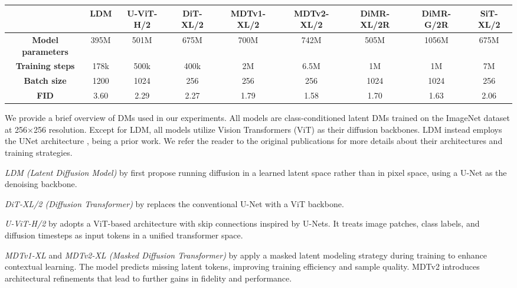 \begin{table*}[h!]
    \scriptsize
        \newcommand{\tightcolsep}{\setlength{\tabcolsep}{3.5pt}} %
    \tightcolsep %
    \centering
        \caption{\textbf{DM details.} We report the training details for the DM  models used in this work.}
    \begin{tabular}{ccccccccc}
    \toprule
\textbf{} & LDM & {U-ViT-H/2} & {DiT-XL/2} & {MDTv1-XL/2} & {MDTv2-XL/2} & {DiMR-XL/2R} & {DiMR-G/2R} & {SiT-XL/2} \\
    \midrule
\textbf{Model parameters} & 395M & 501M & 675M & 700M & 742M & 505M & 1056M & 675M \\

    \textbf{Training steps} & 178k & 500k & 400k & 2M & 6.5M  & 1M & 1M &  7M \\
    \textbf{Batch size} & 1200 & 1024 & 256 & 256 & 256 & 1024 & 1024 & 256  \\
    \textbf{FID} & 3.60 & 2.29 & 2.27 & 1.79 & 1.58 & 1.70 & 1.63  & 2.06 \\
    \bottomrule
    \end{tabular}
    \label{tab:dm_details}
\end{table*}


{We provide a brief overview of DMs used in our experiments. All models are class-conditioned latent DMs trained on the ImageNet dataset at 256×256 resolution.}
{Except for LDM, all models utilize Vision Transformers (ViT) \citep{dosovitskiy2021imageworth16x16words} as their diffusion backbones. LDM instead employs the UNet architecture \cite{unet}, being a prior work. We refer the reader to the original publications for more details about their architectures and training strategies.}

{\textit{LDM (Latent Diffusion Model)} by \citet{rombach2022high} first propose running diffusion in a learned latent space rather than in pixel space, using a U-Net as the denoising backbone.}

{\textit{DiT-XL/2 (Diffusion Transformer)} by \citet{peebles2022dit} replaces the conventional U-Net with a ViT backbone.}

{\textit{U-ViT-H/2} by \citet{bao2022uvit} adopts a ViT-based architecture with skip connections inspired by U-Nets. It treats image patches, class labels, and diffusion timesteps as input tokens in a unified transformer space.}

{\textit{MDTv1-XL} and \textit{MDTv2-XL (Masked Diffusion Transformer)} by \citet{gao2023masked} apply a masked latent modeling strategy during training to enhance contextual learning. The model predicts missing latent tokens, improving training efficiency and sample quality. MDTv2 introduces architectural refinements that lead to further gains in fidelity and performance.}

